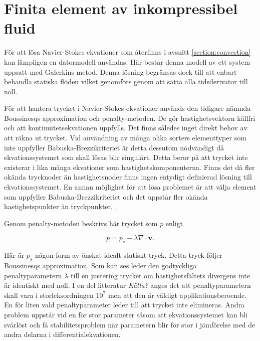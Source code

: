 \section{Finita element av inkompressibel fluid}
\label{sec:femconvection}
För att lösa Navier-Stokes ekvationer som återfinns i avsnitt
\ref{section:convection} kan lämpligen en datormodell användas.
Här består denna modell av ett system uppsatt med Galerkins metod.
Denna lösning begränsas dock till att enbart behandla statiska flöden
vilket genomförs genom att sätta alla tidsderivator till noll.

För att hantera trycket i Navier-Stokes ekvationer
används den tidigare nämnda Boussinesqs approximation
och penalty-metoden. De gör hastighetsvektorn källfri och att
kontinuitetsekvationen uppfylls. Det finns således inget direkt behov av att räkna ut trycket.
Vid användning av många olika sorters elementtyper som inte uppfyller Babuska-Brezzikriteriet
är detta dessutom nödvändigt då ekvationssystemet som skall lösas blir singulärt. 
Detta beror på att trycket inte existerar i lika många ekvationer som hastighetskomponenterna.
Finns det då fler okända trycknoder än hastighetsnoder finns ingen entydigt definierad lösning
till ekvationssystemet. En annan möjlighet för att lösa problemet är att välja element som
uppfyller Babuska-Brezzikriteriet och det uppstår fler okända hastighetspunkter än tryckpunkter. \emph{}.
\cite{babuska1973}\cite{segal2011}

Genom penalty-metoden beskrivs här trycket som $p$ enligt 

\begin{equation}
\label{eq:femconvection:penalty}
p = p_s - \lambda\nabla\cdot\mathbf{v}.
\end{equation}

Här är $p_s$ någon form av önskat idealt statiskt
tryck. Detta tryck följer Boussinesqs approximation.
\cite{heinrich88}\cite{taylor79}
Som kan ses leder den godtyckliga penaltyparametern $\lambda$ till en justering trycket
om hastighetsfältets divergens inte är identiskt med noll. I en del litteratur \emph{\color{red} Källa?} anges 
det att penaltyparametern skall vara i storleksordningen $10^7$ men att den
är väldigt applikationsberoende. En för liten vald penaltyparameter leder till att
trycket inte elimineras. Andra problem uppstår vid en för stor parameter såsom att ekvationssystemet
kan bli svårlöst och få stabilitetsproblem när parametern blir
för stor i jämförelse med de andra delarna i differentialekvationen.\cite{reddy93}\cite{roy05}\cite{basak04}\cite{segal2011}

